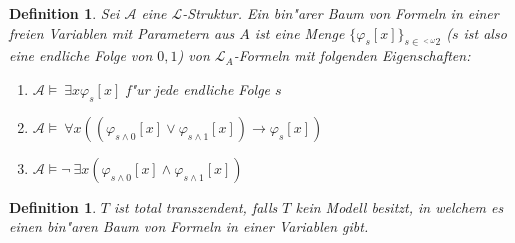 \documentclass[a4paper,12pt,numbers=noenddot,parskip=full]{scrartcl}
\newcommand{\Forall}{~\forall}
\newcommand{\Exists}{~\exists}
\newcommand{\scrL}{\mathcal{L}}
\newcommand{\scrA}{\mathcal{A}}
\theoremstyle{dotless}
\newtheorem{definition}[theorem]{Definition}
\begin{document}
\begin{definition}
	Sei $\scrA$ eine $\scrL$-Struktur. Ein bin"arer Baum von Formeln in einer freien Variablen mit Parametern aus $A$ ist eine Menge $\{\varphi_s [x]\}_{s \in \phantom{}^{<\omega}2}$ ($s$ ist also eine endliche Folge von $0,1$) von $\scrL_A$-Formeln mit folgenden Eigenschaften:
	\begin{enumerate}
		\item $\scrA \models \Exists x \varphi_s[x]$ f"ur jede endliche Folge $s$
		\item $\scrA \models \Forall x ((\varphi_{s \land 0}[x] \lor \varphi_{s \land 1}[x])\rightarrow \varphi_s[x])$
		\item $\scrA \models \lnot \Exists x (\varphi_{s \land 0}[x] \land \varphi_{s \land 1}[x])$
	\end{enumerate}
\end{definition}
\begin{definition}
	$T$ ist \emph{total transzendent}, falls $T$ kein Modell besitzt, in welchem es einen bin"aren Baum von Formeln in einer Variablen gibt.
\end{definition}
\end{document}
